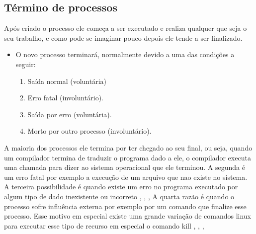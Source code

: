 \subsection{Término de processos}

Após criado o processo ele começa a ser executado e realiza qualquer que seja o seu trabalho, e como pode se imaginar pouco depois ele tende a ser finalizado.

\begin{itemize}[label=$-$]
	\item O novo processo terminará, normalmente devido a uma das condições a seguir:
    \begin{enumerate}
        \item Saída normal (voluntária)
        \item Erro fatal (involuntário). 
        \item Saída por erro (voluntária). 
        \item Morto por outro processo (involuntário). 
    \end{enumerate}
\end{itemize}

A maioria dos processos ele termina por ter chegado ao seu final, ou seja, quando um compilador termina de traduzir o programa dado a ele, o compilador executa uma chamada para dizer ao sistema operacional que ele terminou. A segunda é um erro fatal por exemplo a execução de um arquivo que nao existe no sistema. A terceira possibilidade é quando existe um erro no programa executado por algum tipo de dado inexistente ou incorreto \cite{Tanenbaum2016}, \cite{info2020}, \cite{Morimoto2011}, \cite{Man2020}
A quarta razão é quando o processo sofre influência externa por exemplo por um comando que finalize esse processo. Esse motivo em especial existe uma grande variação de comandos linux para executar esse tipo de recurso em especial o comando kill \cite{Tanenbaum2016}, \cite{info2020}, \cite{Morimoto2011}, \cite{Man2020}

